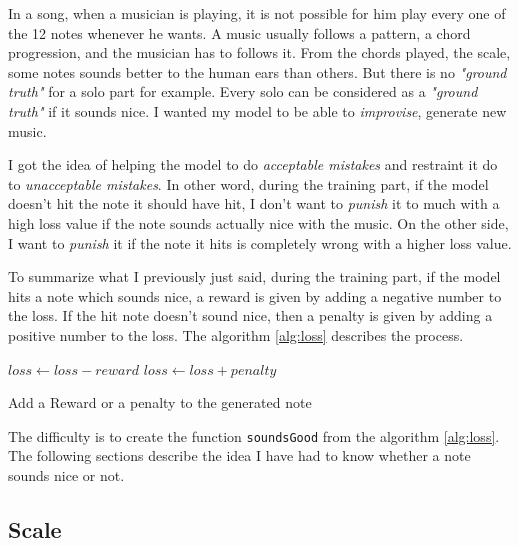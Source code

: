 \documentclass[12pt]{report}
\begin{document}
In a song, when a musician is playing, it is not possible for him play every one of the 12 notes whenever he wants.
A music usually follows a pattern, a chord progression, and the musician has to follows it.
From the chords played, the scale, some notes sounds better to the human ears than others.
But there is no \textit{"ground truth"} for a solo part for example.
Every solo can be considered as a \textit{"ground truth"} if it sounds nice.
I wanted my model to be able to \textit{improvise}, generate new music.

I got the idea of helping the model to do \textit{acceptable mistakes} and restraint it do to \textit{unacceptable mistakes}.
In other word, during the training part, if the model doesn't hit the note it should have hit, I don't want to \textit{punish} it to much with a high loss value if the note sounds actually nice with the music.
On the other side, I want to \textit{punish} it if the note it hits is completely wrong with a higher loss value.

To summarize what I previously just said, during the training part, if the model hits a note which sounds nice, a reward is given by adding a negative number to the loss.
If the hit note doesn't sound nice, then a penalty is given by adding a positive number to the loss.
The algorithm \ref{alg:loss} describes the process.

\begin{algorithm}
    \begin{algorithmic}[1]
        \Statex
                \State $loss \gets loss - reward$
            \Else
                \State $loss \gets loss + penalty$
            \EndIf
            \State {}
        \EndFunction
    \end{algorithmic}
    \caption{Add a Reward or a penalty to the generated note}
    \label{alg:loss}
\end{algorithm}

The difficulty is to create the function \texttt{soundsGood} from the algorithm \ref{alg:loss}.
The following sections describe the idea I have had to know whether a note sounds nice or not.

\subsection{Scale}
\label{sec:scale}
\end{document}
